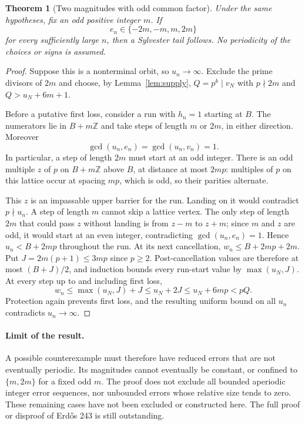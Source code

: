 \documentclass[11pt]{article}
\newtheorem{theorem}{Theorem}
\newcommand{\Z}{\mathbb Z}
\begin{document}
\begin{theorem}[Two magnitudes with odd common factor]\label{thm:twomagnitudes}
Under the same hypotheses, fix an odd positive integer $m$. If
\[
 e_n\in\{-2m,-m,m,2m\}
\]
for every sufficiently large $n$, then a Sylvester tail follows.
No periodicity of the choices or signs is assumed.
\end{theorem}
\begin{proof}
Suppose this is a nonterminal orbit, so $u_n\to\infty$. Exclude the
prime divisors of $2m$ and choose, by Lemma~\ref{lem:supply},
$Q=p^k\mid v_N$ with $p\nmid2m$ and $Q>u_N+6m+1$.

Before a putative first loss, consider a run with $h_n=1$ starting at
$B$. The numerators lie in $B+m\Z$ and take steps of length $m$
or $2m$, in either direction. Moreover
\[
 \gcd(u_n,e_n)=\gcd(u_n,v_n)=1.
\]
In particular, a step of length $2m$ must start at an odd integer.
There is an odd multiple $z$ of $p$ on $B+m\Z$ above $B$, at
distance at most $2mp$: multiples of $p$ on this lattice occur at
spacing $mp$, which is odd, so their parities alternate.

This $z$ is an impassable upper barrier for the run. Landing on it
would contradict $p\nmid u_n$. A step of length $m$ cannot skip a
lattice vertex. The only step of length $2m$ that could pass $z$
without landing is from $z-m$ to $z+m$; since $m$ and $z$ are odd,
it would start at an even integer, contradicting
$\gcd(u_n,e_n)=1$. Hence $u_n<B+2mp$ throughout the run.
At its next cancellation, $w_n\le B+2mp+2m$. Put
$J=2m(p+1)\le3mp$ since $p\ge2$. Post-cancellation values are
therefore at most $(B+J)/2$, and induction bounds every run-start
value by $\max(u_N,J)$. At every step up to and including first loss,
\[
 w_n\le\max(u_N,J)+J\le u_N+2J\le u_N+6mp<pQ.
\]
Protection again prevents first loss, and the resulting uniform bound
on all $u_n$ contradicts $u_n\to\infty$.
\end{proof}

\paragraph{Limit of the result.}
A possible counterexample must therefore have reduced errors that are
not eventually periodic. Its magnitudes cannot eventually be constant,
or confined to $\{m,2m\}$ for a fixed odd $m$.
The proof does not exclude all bounded aperiodic integer error sequences,
nor unbounded errors whose relative size tends to zero. These remaining cases have not been excluded
or constructed here. The full proof or disproof of Erd\H{o}s 243 is
still outstanding.
\end{document}
